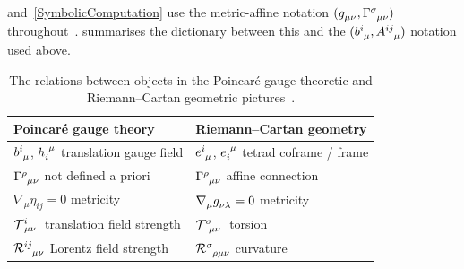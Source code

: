  and~\cref{SymbolicComputation} use the metric-affine
notation $(\g{_{\mu\nu}}, \MAGA{^\sigma_\mu_\nu})$
throughout~\cite{palatini1919deduzione,ferraris1982variational,barker2024palatini}.
 summarises the
dictionary between this and the
$(\tensor{b}{^i_\mu}, \tensor{A}{^{ij}_\mu})$ notation used above.
\begin{table}[t]
  \centering
  \begin{tabular}{@{}ll@{}}
    \toprule
    Poincar\'{e} gauge theory & Riemann--Cartan geometry \\
    \midrule
    $\tensor{b}{^i_\mu}$, $\tensor{h}{_i^\mu}$ translation gauge field
       & $\tensor{e}{^i_\mu}$, $\tensor{e}{_i^\mu}$ tetrad coframe / frame \\
    $\MAGA{^\rho_\mu_\nu}$ not defined a priori
       & $\MAGA{^\rho_\mu_\nu}$ affine connection \\
    $\nabla_\mu \eta_{ij} = 0$ metricity
       & $\rcD{_\mu}\g{_{\nu\lambda}} = 0$ metricity \\
    $\MAGT{^i_{\mu\nu}}$ translation field strength
       & $\MAGT{^\sigma_{\mu\nu}}$ torsion \\
    $\MAGF{^{ij}_{\mu\nu}}$ Lorentz field strength
       & $\MAGF{^\sigma_{\rho\mu\nu}}$ curvature \\
    \bottomrule
  \end{tabular}
  \caption{The relations between objects in
    the Poincar\'{e} gauge-theoretic and Riemann--Cartan
    geometric pictures~\cite[Table~1]{blagojevic2003lectures}.}
  \label{PGTRiemannCartanTranslation}
\end{table}

